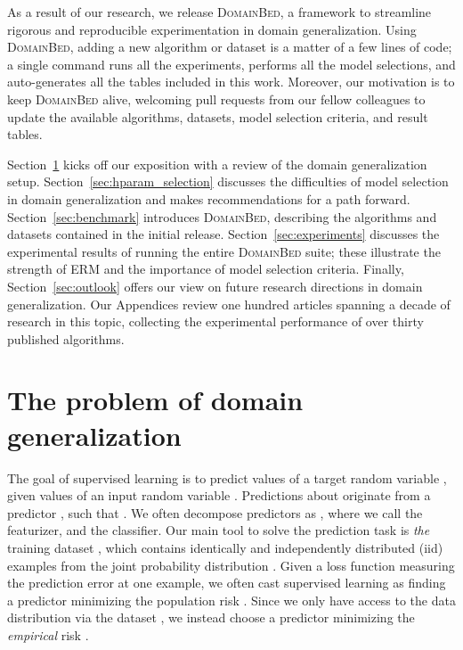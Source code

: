 \documentclass{article}
\newcommand{\domainbed}{\textsc{DomainBed}\xspace}
\begin{document}
As a result of our research, we release \domainbed, a framework to streamline rigorous and reproducible experimentation in domain generalization.
Using \domainbed, adding a new algorithm or dataset is a matter of a few lines of code; a single command runs all the experiments, performs all the model selections, and auto-generates all the tables included in this work.
Moreover, our motivation is to keep \domainbed alive, welcoming pull requests from our fellow colleagues to update the available algorithms, datasets, model selection criteria, and result tables. 

Section~\ref{sec:setup} kicks off our exposition with a review of the domain generalization setup.
Section~\ref{sec:hparam_selection} discusses the difficulties of model selection in domain generalization and makes recommendations for a path forward.
Section~\ref{sec:benchmark} introduces \domainbed, describing the algorithms and datasets contained in the initial release.
Section~\ref{sec:experiments} discusses the experimental results of running the entire \domainbed suite; these illustrate the strength of ERM and the importance of model selection criteria.
Finally, Section~\ref{sec:outlook} offers our view on future research directions in domain generalization.
Our Appendices review one hundred articles spanning a decade of research in this topic, collecting the experimental performance of over thirty published algorithms.

\section{The problem of domain generalization}
\label{sec:setup}

The goal of supervised learning is to predict values  of a target random variable , given values  of an input random variable .
Predictions  about  originate from a predictor , such that .
We often decompose predictors as , where we call  the featurizer, and  the classifier.
Our main tool to solve the prediction task is \emph{the} training dataset , which contains identically and independently distributed (iid) examples from the joint probability distribution .
Given a loss function  measuring the prediction error at one example, we often cast supervised learning as finding a predictor minimizing the population risk .
Since we only have access to the data distribution  via the dataset , we instead choose a predictor minimizing the \emph{empirical} risk 
\citep{vapnik1998statistical}.
\end{document}
